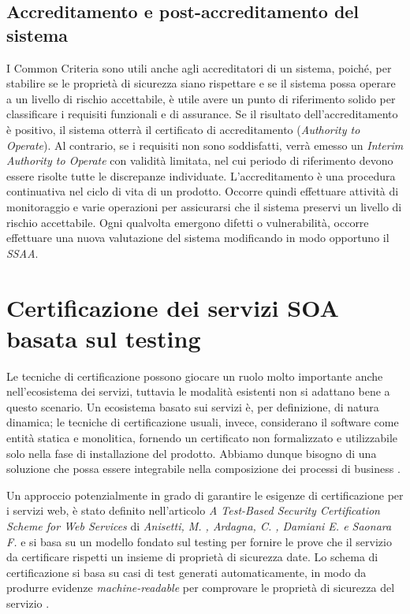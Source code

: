 \documentclass[../main.tex]{subfiles}
\begin{document}
\subsection{Accreditamento e post-accreditamento del sistema}
I Common Criteria sono utili anche agli accreditatori di un sistema, poiché, per stabilire se le proprietà di sicurezza siano rispettare e se il sistema possa operare a un livello di rischio accettabile, è utile avere un punto di riferimento solido per classificare i requisiti funzionali e di assurance.
Se il risultato dell'accreditamento è positivo, il sistema otterrà il certificato di accreditamento (\textit{Authority to Operate}). Al contrario, se i requisiti non sono soddisfatti, verrà emesso un \textit{Interim Authority to Operate} con validità limitata, nel cui periodo di riferimento devono essere risolte tutte le discrepanze individuate.
L'accreditamento è una procedura continuativa nel ciclo di vita di un prodotto. Occorre quindi effettuare attività di monitoraggio e varie operazioni per assicurarsi che il sistema preservi un livello di rischio accettabile. Ogni qualvolta emergono difetti o vulnerabilità, occorre effettuare una nuova valutazione del sistema modificando in modo opportuno il \textit{SSAA}.

\section{Certificazione dei servizi SOA basata sul testing}
Le tecniche di certificazione possono giocare un ruolo molto importante anche nell'ecosistema dei servizi, tuttavia le modalità esistenti non si adattano bene a questo scenario. Un ecosistema basato sui servizi è, per definizione, di natura dinamica; le tecniche di certificazione usuali, invece, considerano il software come entità statica e monolitica, fornendo un certificato non formalizzato e utilizzabile solo nella fase di installazione del prodotto.
Abbiamo dunque bisogno di una soluzione che possa essere integrabile nella composizione dei processi di business \cite{DamianiCitCertSoa} \cite{CitCertSoa}.

Un approccio potenzialmente in grado di garantire le esigenze di certificazione per i servizi web, è stato definito nell'articolo \textit{A Test-Based Security Certification Scheme for Web Services} di \textit{Anisetti, M. , Ardagna, C. , Damiani E. e Saonara F.} \cite{CitCertSoa} e si basa su un modello fondato sul testing per fornire le prove che il servizio da certificare rispetti un insieme di proprietà di sicurezza date.
Lo schema di certificazione si basa su casi di test generati automaticamente, in modo da produrre evidenze \textit{machine-readable} per comprovare le proprietà di sicurezza del servizio \cite{CitCertSoa}.
\end{document}
